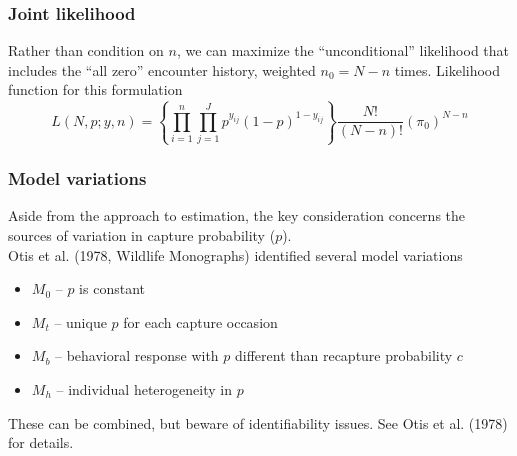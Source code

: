 \documentclass[color=usenames,dvipsnames]{beamer}\usepackage[]{graphicx}\usepackage[]{color}
\begin{document}
\begin{frame}
  \frametitle{Joint likelihood}
  \small
  Rather than condition on $n$, we can maximize the ``unconditional''
  likelihood that includes the ``all zero'' encounter history,
  weighted $n_0=N-n$ times. 
  \pause
  \vfill
  \flushleft
  Likelihood function for this formulation
  \begin{equation*}
    L(N,p; y,n) = \left\{\prod_{i=1}^n \prod_{j=1}^J p^{y_{ij}}(1-p)^{1-y_{ij}}\right\}
    \frac{N!}{(N-n)!}  \left(\pi_0\right)^{N-n}
  \end{equation*}
\end{frame}



\begin{frame}
  \frametitle{Model variations}
  Aside from the approach to estimation, the key consideration
  concerns the sources of variation in capture probability ($p$). \\
  \pause
  \vfill
  Otis et al. (1978, Wildlife Monographs) identified several model variations
  \begin{itemize}
    \small
    \item $M_0$ -- $p$ is constant
    \item $M_t$ -- unique $p$ for each capture occasion
    \item \hangindent=0.8cm $M_b$ -- behavioral response with $p$ different than
      recapture probability $c$
    \item $M_h$ -- individual heterogeneity in $p$
  \end{itemize}
  \pause \vfill
  These can be combined, but beware of identifiability issues. See
  Otis et al. (1978) for details. 
\end{frame}
\end{document}
